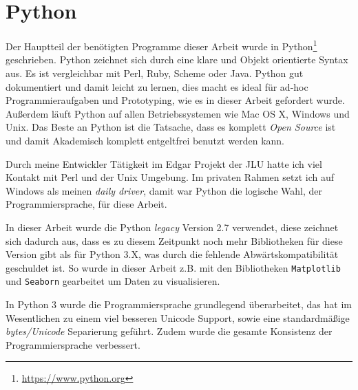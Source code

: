 


\section{Python}
Der Hauptteil der benötigten Programme dieser Arbeit wurde in Python\footnote{\url{https://www.python.org}} geschrieben. Python zeichnet sich durch eine klare und Objekt orientierte Syntax aus. Es ist vergleichbar mit Perl, Ruby, Scheme oder Java. Python gut dokumentiert und damit leicht zu lernen, dies macht es ideal für ad-hoc Programmieraufgaben und Prototyping, wie es in dieser Arbeit gefordert wurde. Außerdem läuft Python auf allen Betriebssystemen wie Mac OS X, Windows und Unix. Das Beste an Python ist die Tatsache, dass es komplett \emph{Open Source} ist und damit Akademisch komplett entgeltfrei benutzt werden kann.

Durch meine Entwickler Tätigkeit im Edgar\cite{Yu.2017} Projekt der JLU hatte ich viel Kontakt mit Perl und der Unix Umgebung. Im privaten Rahmen setzt ich auf Windows als meinen \emph{daily driver}, damit war Python die logische Wahl, der Programmiersprache, für diese Arbeit.

In dieser Arbeit wurde die Python \emph{legacy} Version 2.7 verwendet, diese zeichnet sich dadurch aus, dass es zu diesem Zeitpunkt noch mehr Bibliotheken für diese Version gibt als für Python 3.X, was durch die fehlende Abwärtskompatibilität geschuldet ist. So wurde in dieser Arbeit z.B. mit den Bibliotheken \texttt{Matplotlib} und \texttt{Seaborn} gearbeitet um Daten zu visualisieren.

In Python 3 wurde die Programmiersprache grundlegend überarbeitet, das hat im Wesentlichen zu einem viel besseren Unicode Support, sowie eine standardmäßige \emph{bytes/Unicode} Separierung geführt. Zudem wurde die gesamte Konsistenz der Programmiersprache verbessert.


